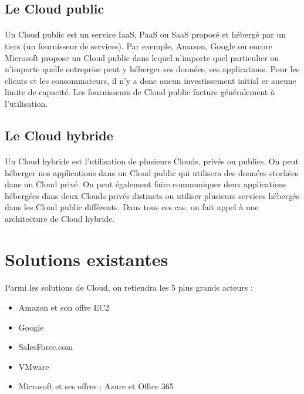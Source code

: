 \documentclass[a4paper,12pt]{report}
\begin{document}
\begin{onehalfspace}
	\subsection{Le Cloud public}
	
	\paragraph*{}
	Un Cloud public est un service IaaS, PaaS ou SaaS proposé et hébergé par un tiers (un fournisseur de services). Par exemple, Amazon, Google ou encore Microsoft propose un Cloud public dans lequel n’importe quel particulier ou n’importe quelle entreprise peut y héberger ses données, ses applications. Pour les clients et les consommateurs, il n’y a donc aucun investissement initial er aucune limite de capacité. Les fournisseurs de Cloud public facture généralement à l’utilisation.	
	
	\subsection{Le Cloud hybride}
	
	\paragraph*{}
	Un Cloud hybride est l’utilisation de plusieurs Clouds, privés ou publics.
On peut héberger nos applications dans un Cloud public qui utilisera des données stockées dans un Cloud privé. On peut également faire communiquer deux applications hébergées dans deux Clouds privés distincts ou utiliser plusieurs services hébergés dans les Cloud public différents. Dans tous ces cas, on fait appel à une architecture de Cloud hybride.
	
	
	\section{Solutions existantes}
	
	\paragraph*{}
	Parmi les solutions de Cloud, on retiendra les 5 plus grands acteurs : 
	\begin{itemize}
		\item Amazon et son offre EC2
		\item Google
		\item SalesForce.com
		\item VMware
		\item Microsoft et ses offres : Azure et Office 365
	\end{itemize}
	

\end{onehalfspace}
\end{document}
